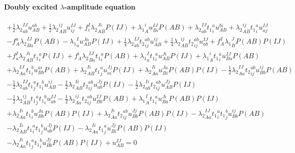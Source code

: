 \paragraph{Doubly excited $\lambda$-amplitude equation}

\begin{gather*}
+ \frac{1}{2}{\lambda_2}^{IJ}_{ab} u^{ab}_{AB}
+ \frac{1}{2}{\lambda_2}^{ij}_{AB} u^{IJ}_{ij}
+ f^{I}_{i} {\lambda_2}^{Ji}_{AB} P(IJ)
+ {\lambda_1}^{i}_{A} u^{IJ}_{Bi} P(AB)
+ {\lambda_2}^{IJ}_{ab} {t_1}^{a}_{i} u^{bi}_{AB}
+ {\lambda_2}^{ij}_{AB} {t_1}^{a}_{i} u^{IJ}_{aj} \\
- f^{a}_{A} {\lambda_2}^{IJ}_{Ba} P(AB)
- {\lambda_1}^{I}_{a} u^{Ja}_{AB} P(IJ)
+ \frac{1}{4}{\lambda_2}^{IJ}_{ab} {t_2}^{ab}_{ij} u^{ij}_{AB}
+ \frac{1}{4}{\lambda_2}^{ij}_{AB} {t_2}^{ab}_{ij} u^{IJ}_{ab}
+ f^{I}_{A} {\lambda_1}^{J}_{B} P(AB) P(IJ) \\
+ f^{I}_{a} {\lambda_2}^{Ji}_{AB} {t_1}^{a}_{i} P(IJ)
+ f^{i}_{A} {\lambda_2}^{IJ}_{Ba} {t_1}^{a}_{i} P(AB)
+ {\lambda_1}^{I}_{a}   {t_1}^{a}_{i} u^{Ji}_{AB} P(IJ)
+ {\lambda_1}^{i}_{A}   {t_1}^{a}_{i} u^{IJ}_{Ba} P(AB) \\
+ {\lambda_2}^{IJ}_{Aa} {t_1}^{b}_{i} u^{ai}_{Bb} P(AB)
+ {\lambda_2}^{Ii}_{AB} {t_1}^{a}_{j} u^{Jj}_{ai} P(IJ)
+ {\lambda_2}^{Ii}_{Aa} u^{Ja}_{Bi} P(AB) P(IJ)
- \frac{1}{2}{\lambda_2}^{IJ}_{Aa} {t_2}^{ab}_{ij} u^{ij}_{Bb} P(AB) \\
- \frac{1}{2}{\lambda_2}^{IJ}_{ab} {t_1}^{a}_{j} {t_1}^{b}_{i} u^{ij}_{AB}
- \frac{1}{2}{\lambda_2}^{Ii}_{AB} {t_2}^{ab}_{ij} u^{Jj}_{ab} P(IJ)
- \frac{1}{2}{\lambda_2}^{Ii}_{ab} {t_2}^{ab}_{ij} u^{Jj}_{AB} P(IJ) \\
- \frac{1}{2}{\lambda_2}^{ij}_{AB} {t_1}^{a}_{j} {t_1}^{b}_{i} u^{IJ}_{ab}
- \frac{1}{2}{\lambda_2}^{ij}_{Aa} {t_2}^{ab}_{ij} u^{IJ}_{Bb} P(AB)
+ {\lambda_1}^{I}_{A}   {t_1}^{a}_{i} u^{Ji}_{Ba} P(AB) P(IJ) \\
+ {\lambda_2}^{Ii}_{Aa} {t_1}^{b}_{i} u^{Ja}_{Bb} P(AB) P(IJ)
+ {\lambda_2}^{Ii}_{Aa} {t_2}^{ab}_{ij} u^{Jj}_{Bb} P(AB) P(IJ)
- {\lambda_2}^{IJ}_{Aa} {t_1}^{a}_{i} {t_1}^{b}_{j} u^{ij}_{Bb} P(AB) \\
- {\lambda_2}^{Ii}_{AB} {t_1}^{a}_{i} {t_1}^{b}_{j} u^{Jj}_{ab} P(IJ)
- {\lambda_2}^{Ii}_{Aa} {t_1}^{a}_{j} u^{Jj}_{Bi} P(AB) P(IJ) \\
- {\lambda_2}^{Ii}_{Aa} {t_1}^{a}_{j} {t_1}^{b}_{i} u^{Jj}_{Bb} P(AB) P(IJ)
+ u^{IJ}_{AB} = 0
\end{gather*}

